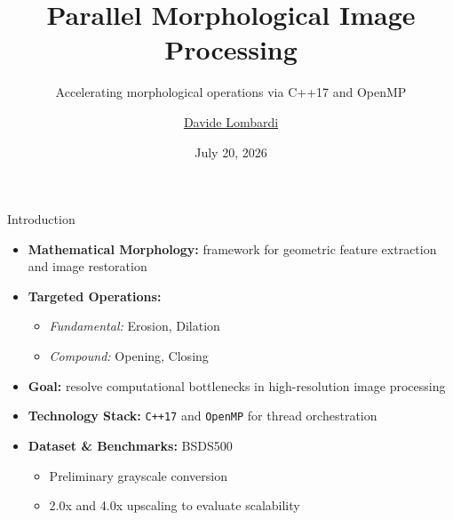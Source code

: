 \documentclass{beamer}
\title{Parallel Morphological Image Processing}
\subtitle{Accelerating morphological operations via C++17 and OpenMP}
\author{\href{mailto:davide.lombardi2@edu.unifi.it}{Davide Lombardi}}
\date{July 20, 2026}
\begin{document}
\maketitle

\begin{frame}{Introduction}
  \begin{itemize}
    \item \textbf{Mathematical Morphology:} framework for geometric feature extraction and image restoration
    \item \textbf{Targeted Operations:}
      \begin{itemize}
        \item \textit{Fundamental:} Erosion, Dilation
        \item \textit{Compound:} Opening, Closing
      \end{itemize}
    \item \textbf{Goal:} resolve computational bottlenecks in high-resolution image processing
    \item \textbf{Technology Stack:} \texttt{C++17} and \texttt{OpenMP} for thread orchestration
    \item \textbf{Dataset \& Benchmarks:} BSDS500
      \begin{itemize}
        \item Preliminary grayscale conversion
        \item 2.0x and 4.0x upscaling to evaluate scalability
      \end{itemize}
  \end{itemize}
\end{frame}
\end{document}
